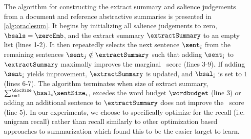 The algorithm for constructing the extract summary and salience judgements
from a document and reference abstractive summaries is presented
in \autoref{alg:oraclesum}. It begins by initializing all salience judgements
to zero, $\bsals = \zeroEmb$, and the extract summary $\extractSummary$
to an empty list (lines 1-2). It then repeatedly selects the next sentence 
$\sent_{\hat{i}}$ from the remaining sentences $\sent_j \notin \extractSummary$ 
such that adding $\sent_{\hat{i}}$ to $\extractSummary$ maximally 
improves the marginal \rouge~score (lines 3-9). 
If adding $\sent_{\hat{i}}$ yields
improvement, $\extractSummary$ is updated, and $\bsal_{\hat{i}}$ is 
set to $1$ (lines 6-7). The algorithm terminates when size of extract summary, $\sum_{i=1}^\docSize \bsal_i \sentSize_i$, excedes the word budget $\wordbudget$ (line 3) or adding an additional sentence to $\extractSummary$ does not
improve the \rouge~score (line 5). 
In our experiments, we choose to specifically optimize for the  recall (i.e. unigram recall) rather than 
 recall similarly to other optimization based approaches to summarization 
\citep{sipos2012large,durrett2016learning} which found this to
be the easier target to learn.









